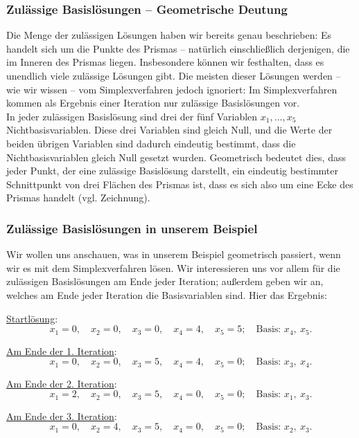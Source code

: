 \documentclass[smaller]{beamer}
\begin{document}
\begin{frame}
 \frametitle{Zulässige Basislösungen -- Geometrische Deutung}
 Die Menge der zulässigen Lösungen haben wir bereits genau beschrieben: Es handelt sich um die Punkte des Prismas -- natürlich einschließlich derjenigen, die im Inneren des Prismas liegen. Insbesondere können wir festhalten, dass es unendlich viele zulässige Lösungen gibt. \alert{Die meisten dieser Lösungen werden -- wie wir wissen -- vom Simplexverfahren jedoch ignoriert}: Im Simplexverfahren kommen als Ergebnis einer Iteration nur \alert{zulässige Basislösungen} vor. \\ \vspace*{0.2cm}
 In jeder zulässigen Basislösung sind drei der fünf Variablen $x_1,\ldots,x_5$ Nichtbasisvariablen. Diese drei Variablen sind gleich Null, und die Werte der beiden übrigen Variablen sind dadurch eindeutig bestimmt, dass die Nichtbasisvariablen gleich Null gesetzt wurden. \alert{Geometrisch bedeutet dies, dass jeder Punkt, der eine zulässige Basislösung darstellt, ein eindeutig bestimmter Schnittpunkt von drei Flächen des Prismas ist}, dass es sich also um eine Ecke des Prismas handelt (vgl. Zeichnung).

\end{frame}

\begin{frame}
 \frametitle{Zulässige Basislösungen in unserem Beispiel}
 Wir wollen uns anschauen, was in unserem Beispiel geometrisch passiert, wenn wir es mit dem Simplexverfahren lösen. Wir interessieren uns vor allem für die \alert{zulässigen Basislösungen am Ende jeder Iteration}; außerdem geben wir an, welches am Ende jeder Iteration die Basisvariablen sind. Hier das Ergebnis: \\ \vspace*{0.2cm}

\underline{Startlösung}:
\[
x_1=0,\quad
x_2=0,\quad
x_3=0,\quad
x_4=4,\quad
x_5=5;\quad
\text{Basis: } x_4,\ x_5.
\]

\underline{Am Ende der 1. Iteration}:
\[
x_1=0,\quad
x_2=0,\quad
x_3=5,\quad
x_4=4,\quad
x_5=0;\quad
\text{Basis: } x_3,\ x_4.
\]

\underline{Am Ende der 2. Iteration}:
\[
x_1=2,\quad
x_2=0,\quad
x_3=5,\quad
x_4=0,\quad
x_5=0;\quad
\text{Basis: } x_1,\ x_3.
\]

\underline{Am Ende der 3. Iteration}:
\[
x_1=0,\quad
x_2=4,\quad
x_3=5,\quad
x_4=0,\quad
x_5=0;\quad
\text{Basis: } x_2,\ x_3.
\]
\end{frame}
\end{document}
